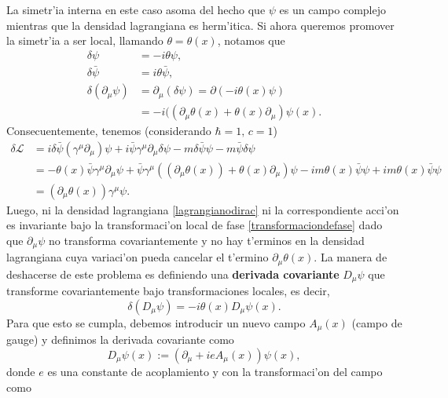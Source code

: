 La simetr'ia interna en este caso asoma del hecho que $\psi$ es un campo complejo  mientras que la densidad lagrangiana  es herm'itica. 
Si ahora queremos promover la simetr'ia a ser local,  llamando $\theta=\theta(x)$, notamos que
\begin{equation}
\begin{aligned}\label{transformaciondefase}
\delta \psi&=-i\theta \psi, \\
\delta\bar{\psi}&=i\theta\bar{\psi}, \\
\delta(\partial_\mu \psi)&=\partial_\mu(\delta\psi)=\partial(-i\theta(x)\psi) \\
&=-i((\partial_\mu \theta(x)+\theta(x)\partial_\mu)\psi(x).
\end{aligned}
\end{equation}
Consecuentemente, tenemos (considerando $\hbar=1,\,c=1$)
\begin{equation}
\begin{aligned}
\delta \mathcal{L}&=i\delta\bar{\psi}( \gamma^\mu \partial_\mu) \psi + i\bar{\psi} \gamma^\mu \partial_\mu \delta \psi-m\delta \bar{\psi}\psi-m\bar{\psi} \delta \psi \\
&=-\theta(x)\bar{\psi}\gamma^\mu\partial_\mu\psi+\bar{\psi}\gamma^\mu((\partial_\mu\theta(x))+\theta(x)\partial_\mu)\psi-im\theta(x)\bar{\psi}\psi+im\theta(x)\bar{\psi}\psi \\
&=(\partial_\mu\theta(x))\gamma^\mu\psi.
\end{aligned}
\end{equation}
Luego, ni la densidad lagrangiana \eqref{lagrangianodirac} ni la correspondiente acci'on es invariante bajo la transformaci'on local de fase \eqref{transformaciondefase} dado que $\partial_\mu \psi$ no transforma covariantemente y no hay t'erminos en la densidad lagrangiana cuya variaci'on pueda cancelar el t'ermino $\partial_\mu \theta(x)$.
La manera de deshacerse de este problema es definiendo una \textbf{derivada covariante} $D_\mu \psi$ que transforme covariantemente bajo transformaciones locales, es decir,
\begin{equation}
\delta(D_\mu\psi)=-i\theta(x)D_\mu\psi(x).
\end{equation}
Para que esto se cumpla, debemos introducir un nuevo campo  $A_\mu (x)$ (campo de gauge) y definimos la derivada covariante como
\begin{equation}
D_\mu \psi(x):=(\partial_\mu+ieA_\mu(x))\psi(x), \label{derivadacovariante1}
\end{equation}
donde $e$ es una constante de acoplamiento y con la transformaci'on del campo como
